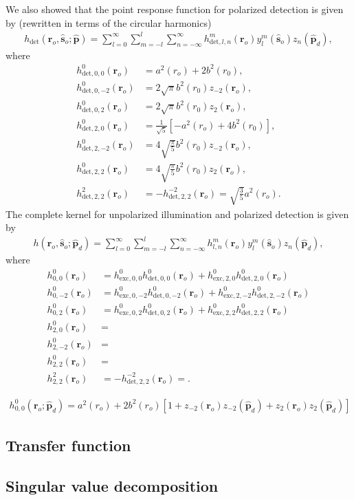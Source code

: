 \documentclass[11pt]{article}
\providecommand{\ro}[1]{\mathbf{\mathbf{r}}_o}
\providecommand{\so}[1]{\mathbf{\hat{s}}_o}
\providecommand{\mh}[1]{\mathbf{\hat{#1}}}
\begin{document}
We also showed that the point response function for polarized detection is given
by (rewritten in terms of the circular harmonics)
\begin{align}
  h_{\text{det}}(\ro{}, \so{}; \mh{p}) = \sum_{l=0}^{\infty}\sum_{m=-l}^l\sum_{n=-\infty}^{\infty} h_{\text{det},l,n}^m(\ro{})y_l^m(\so{})z_n(\mh{p}_d), 
\end{align}
where
\begin{align}
  h_{\text{det},0,0}^0(\ro{}) &= a^2(r_o) + 2b^2(r_0),\\
  h_{\text{det},0,-2}^0(\ro{}) &= 2\sqrt{\pi} b^2(r_0)z_{-2}(\ro{}),\\
  h_{\text{det},0,2}^0(\ro{}) &= 2\sqrt{\pi} b^2(r_0)z_{2}(\ro{}),\\
  h_{\text{det},2,0}^0(\ro{}) &= \frac{1}{\sqrt{5}}\left[-a^2(r_o) + 4b^2(r_0)\right],\\
  h_{\text{det},2,-2}^0(\ro{}) &= 4\sqrt{\frac{\pi}{5}}b^2(r_0)z_{-2}(\ro{}),\\
  h_{\text{det},2,2}^0(\ro{}) &= 4\sqrt{\frac{\pi}{5}}b^2(r_0)z_{2}(\ro{}),\\
  h_{\text{det},2,2}^2(\ro{}) &= -h_{\text{det},2,2}^{-2}(\ro{}) = \sqrt{\frac{3}{5}}a^2(r_o).
\end{align}
The complete kernel for unpolarized illumination and polarized detection is given by
\begin{align}
  h(\ro{}, \so{}; \mh{p}_d) = \sum_{l=0}^{\infty}\sum_{m=-l}^l\sum_{n=-\infty}^{\infty} h_{l,n}^m(\ro{})y_l^m(\so{})z_n(\mh{p}_d), 
\end{align}
where
\begin{align}
  h_{0,0}^0(\ro{}) &= h_{\text{exc},0,0}^0h_{\text{det},0,0}^0(\ro{}) + h_{\text{exc},2,0}^0h_{\text{det},2,0}^0(\ro{})\\
  h_{0,-2}^0(\ro{}) &= h_{\text{exc},0,-2}^0h_{\text{det},0,-2}^0(\ro{}) + h_{\text{exc},2,-2}^0h_{\text{det},2,-2}^0(\ro{})\\
  h_{0,2}^0(\ro{}) &= h_{\text{exc},0,2}^0h_{\text{det},0,2}^0(\ro{}) + h_{\text{exc},2,2}^0h_{\text{det},2,2}^0(\ro{})\\
  h_{2,0}^0(\ro{}) &= \\
  h_{2,-2}^0(\ro{}) &= \\
  h_{2,2}^0(\ro{}) &= \\
  h_{2,2}^2(\ro{}) &= -h_{\text{det},2,2}^{-2}(\ro{}) = .
\end{align}


\begin{align}
  h_{0,0}^0(\ro{}; \mh{p}_d) = a^2(r_o) + 2b^2(r_o)[1 + z_{-2}(\ro{})z_{-2}(\mh{p}_d) + z_{2}(\ro{})z_{2}(\mh{p}_d)]
\end{align}


\subsection{Transfer function}
\subsection{Singular value decomposition}


{}

\end{document}
